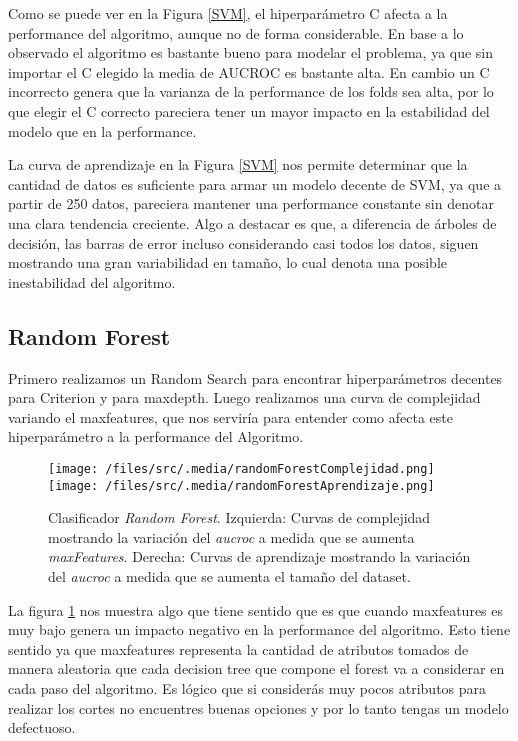 Como se puede ver en la Figura \ref{SVM}, el hiperparámetro C afecta a la performance del algoritmo, aunque no de forma considerable. En base a lo observado el algoritmo es bastante bueno para modelar el problema, ya que sin importar el C elegido la media de AUCROC es bastante alta. En cambio un C incorrecto genera que la varianza de la performance de los folds sea alta, por lo que elegir el C correcto pareciera tener un mayor impacto en la estabilidad del modelo que en la performance.

La curva de aprendizaje en la Figura \ref{SVM} nos permite determinar que la cantidad de datos es suficiente para armar un modelo decente de SVM, ya que a partir de 250 datos, pareciera mantener una performance constante sin denotar una clara tendencia creciente. Algo a destacar es que, a diferencia de árboles de decisión, las barras de error incluso considerando casi todos los datos, siguen mostrando una gran variabilidad en tamaño, lo cual denota una posible inestabilidad del algoritmo.

\subsection{Random Forest}

Primero realizamos un Random Search para encontrar hiperparámetros decentes para Criterion y para maxdepth. Luego realizamos una curva de complejidad variando el maxfeatures, que nos serviría para entender como afecta este hiperparámetro a la performance del Algoritmo. 

\begin{figure}[!htbp]
    \centering
    \texttt{[image: /files/src/.media/randomForestComplejidad.png]}
    \texttt{[image: /files/src/.media/randomForestAprendizaje.png]}
    \caption{Clasificador \textit{Random Forest}. Izquierda: Curvas de complejidad mostrando la variación del \textit{aucroc} a medida que se aumenta \textit{maxFeatures}. Derecha: Curvas de aprendizaje mostrando la variación del \textit{aucroc} a medida que se aumenta el tamaño del dataset.}
    \label{RF}
\end{figure}

La figura \ref{RF} nos muestra algo que tiene sentido que es que cuando maxfeatures es muy bajo genera un impacto negativo en la performance del algoritmo. Esto tiene sentido ya que maxfeatures representa la cantidad de atributos tomados de manera aleatoria que cada decision tree que compone el forest va a considerar en cada paso del algoritmo. Es lógico que si considerás muy pocos atributos para realizar los cortes no encuentres buenas opciones y por lo tanto tengas un modelo defectuoso.


